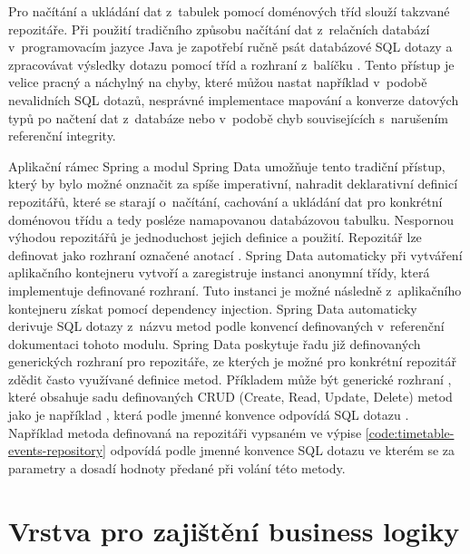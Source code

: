 Pro načítání a ukládání dat z~tabulek pomocí doménových tříd slouží takzvané repozitáře. Při použití tradičního způsobu načítání dat z~relačních databází v~programovacím jazyce Java je zapotřebí ručně psát databázové SQL dotazy a zpracovávat výsledky dotazu pomocí tříd a rozhraní z~balíčku . Tento přístup je velice pracný a náchylný na chyby, které můžou nastat například v~podobě nevalidních SQL dotazů, nesprávné implementace mapování a konverze datových typů po načtení dat z~databáze nebo v~podobě chyb souvisejících s~narušením referenční integrity. 

Aplikační rámec Spring a modul Spring Data umožňuje tento tradiční přístup, který by bylo možné onznačit za spíše imperativní, nahradit deklarativní definicí repozitářů, které se starají o~načítání, cachování a ukládání dat pro konkrétní doménovou třídu a tedy posléze namapovanou databázovou tabulku. Nespornou výhodou repozitářů je jednoduchost jejich definice a použití. Repozitář lze definovat jako rozhraní označené anotací . Spring Data automaticky při vytváření aplikačního kontejneru vytvoří a zaregistruje instanci anonymní třídy, která implementuje definované rozhraní. Tuto instanci je možné následně z~aplikačního kontejneru získat pomocí dependency injection. Spring Data automaticky derivuje SQL dotazy z~názvu metod podle konvencí definovaných v~referenční dokumentaci tohoto modulu. Spring Data poskytuje řadu již definovaných generických rozhraní pro repozitáře, ze kterých je možné pro konkrétní repozitář zdědit často využívané definice metod. Příkladem může být generické rozhraní , které obsahuje sadu definovaných CRUD (Create, Read, Update, Delete) metod jako je například , která podle jmenné konvence odpovídá SQL dotazu . Například metoda  definovaná na repozitáři  vypsaném ve výpise \ref{code:timetable-events-repository} odpovídá podle jmenné konvence SQL dotazu  ve kterém se za parametry  a  dosadí hodnoty předané při volání této metody.


\section{Vrstva pro zajištění business logiky}

